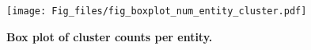 \begin{figure}[h]
 \centering
  \texttt{[image: Fig\_files/fig\_boxplot\_num\_entity\_cluster.pdf]}
  \caption{\textbf{Box plot of cluster counts per entity.}}
  \label{boxplot_num_entity_cluster}
\end{figure}

